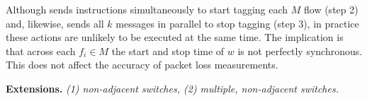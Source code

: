 
Although \pcnt sends instructions simultaneously to start tagging each $M$ flow (step 2) and, likewise, sends all $k$ messages in parallel to stop tagging (step 3), in practice
these actions are unlikely to be executed at the same time. %
The implication is that across each $f_i \in M$ the start and stop time of $w$ is not perfectly synchronous.  This does not affect the accuracy of \pcnt packet loss measurements.



{\bf \pcnt Extensions.}  
{\it (1) non-adjacent switches, (2) multiple, non-adjacent switches.}

